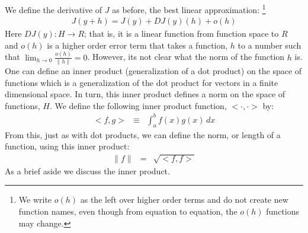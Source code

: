 \documentclass{article}
\begin{document}
We define the derivative of $J$ as before, the best linear approximation:%
\footnote{We write $o(h)$ as the left over higher order terms and do not create new
function names, even though from equation to equation, the $o(h)$ functions may change.}
\begin{eqnarray}
  J(y + h) = J(y) + DJ(y)(h) + o(h)
\end{eqnarray}
Here $DJ(y): H \rightarrow R$; that is, it is a linear function from
function space to $R$ and $o(h)$ is a
higher order error term that takes a function, $h$ to a number such that
$\lim_{h \rightarrow 0}\frac{o(h)}{\|h\|} = 0$. However, its not clear what the
norm of the function $h$ is. One can define an
inner product (generalization of a dot product) on the space of
functions which is a generalization of the dot product for vectors in
a finite dimensional space. In turn, this inner product defines a norm on the space
of functions, $H$.
We define the following inner product function,
$<\!\cdot, \cdot\!>$ by:
\begin{eqnarray}
  <\!f, g\!> & \equiv & \int_a^b f(x) g(x)\, dx \label{inner_prod}
\end{eqnarray}
From this, just as with dot products, we can define the norm, or length of a function,
using this inner product:
\begin{eqnarray}
  \|f\| & = & \sqrt{<\!f,f\!>}
\end{eqnarray}
As a brief aside we discuss the inner product.
\end{document}
